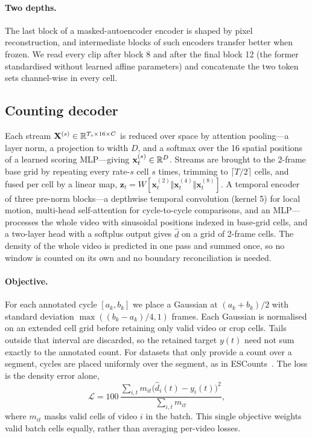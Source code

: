 \paragraph{Two depths.}
The last block of a masked-autoencoder encoder is shaped by pixel
reconstruction, and intermediate blocks of such encoders transfer better when
frozen. We read every clip after block 8 and after the final block 12 (the
former standardised without learned affine parameters) and concatenate the two
token sets channel-wise in every cell.

\subsection{Counting decoder}
\label{sec:decoder}
Each stream $\mathbf{X}^{(s)}\in\mathbb{R}^{T_s\times 16\times C}$ is reduced over space
by attention pooling---a layer norm, a projection to width $D$, and a softmax
over the 16 spatial positions of a learned scoring MLP---giving
$\mathbf{x}^{(s)}_t\in\mathbb{R}^D$. Streams are brought to the 2-frame base grid by
repeating every rate-$s$ cell $s$ times, trimming to $\lceil T/2\rceil$ cells,
and fused per cell by a linear map,
$\mathbf{z}_t=W[\mathbf{x}^{(2)}_t\Vert\mathbf{x}^{(4)}_t\Vert\mathbf{x}^{(8)}_t]$.
A temporal encoder of three pre-norm blocks---a depthwise temporal convolution (kernel 5) for local motion,
multi-head self-attention for cycle-to-cycle comparisons, and an MLP---processes
the whole video with sinusoidal positions indexed in base-grid cells, and a two-layer
head with a softplus output gives $\hat d$ on a grid of 2-frame cells. The
density of the whole video is predicted in one pass and summed once, so no window
is counted on its own and no boundary reconciliation is needed.

\paragraph{Objective.}
For each annotated cycle $[a_k,b_k]$ we place a Gaussian at $(a_k+b_k)/2$ with
standard deviation $\max((b_k-a_k)/4,1)$ frames. Each Gaussian is normalised on
an extended cell grid before retaining only valid video or crop cells. Tails
outside that interval are discarded, so the retained target $y(t)$ need not
sum exactly to the annotated count. For datasets that only provide a count over
a segment, cycles are placed uniformly over the segment, as in
ESCounts~\cite{sinha2024escounts}. The loss is the density error alone,
\begin{equation}
\mathcal{L}=100\,\frac{\sum_{i,t}m_{it}\big(\hat d_i(t)-y_i(t)\big)^2}
{\sum_{i,t}m_{it}} ,
\label{eq:loss}
\end{equation}
where $m_{it}$ masks valid cells of video $i$ in the batch. This single objective
weights valid batch cells equally, rather than averaging per-video losses.

